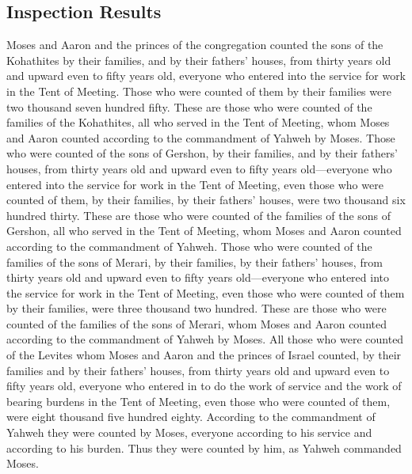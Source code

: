 \hypertarget{inspection-results}{%
\subsection{Inspection Results}\label{inspection-results}}

 Moses and Aaron and the princes of the congregation
counted the sons of the Kohathites by their families, and by their
fathers' houses,  from thirty years old and upward even
to fifty years old, everyone who entered into the service for work in
the Tent of Meeting.  Those who were counted of them by
their families were two thousand seven hundred fifty. 
These are those who were counted of the families of the Kohathites, all
who served in the Tent of Meeting, whom Moses and Aaron counted
according to the commandment of Yahweh by Moses.  Those
who were counted of the sons of Gershon, by their families, and by their
fathers' houses,  from thirty years old and upward even
to fifty years old---everyone who entered into the service for work in
the Tent of Meeting,  even those who were counted of
them, by their families, by their fathers' houses, were two thousand six
hundred thirty.  These are those who were counted of the
families of the sons of Gershon, all who served in the Tent of Meeting,
whom Moses and Aaron counted according to the commandment of Yahweh.
 Those who were counted of the families of the sons of
Merari, by their families, by their fathers' houses, 
from thirty years old and upward even to fifty years old---everyone who
entered into the service for work in the Tent of Meeting,
 even those who were counted of them by their families,
were three thousand two hundred.  These are those who
were counted of the families of the sons of Merari, whom Moses and Aaron
counted according to the commandment of Yahweh by Moses. 
All those who were counted of the Levites whom Moses and Aaron and the
princes of Israel counted, by their families and by their fathers'
houses,  from thirty years old and upward even to fifty
years old, everyone who entered in to do the work of service and the
work of bearing burdens in the Tent of Meeting,  even
those who were counted of them, were eight thousand five hundred eighty.
 According to the commandment of Yahweh they were counted
by Moses, everyone according to his service and according to his burden.
Thus they were counted by him, as Yahweh commanded Moses.

